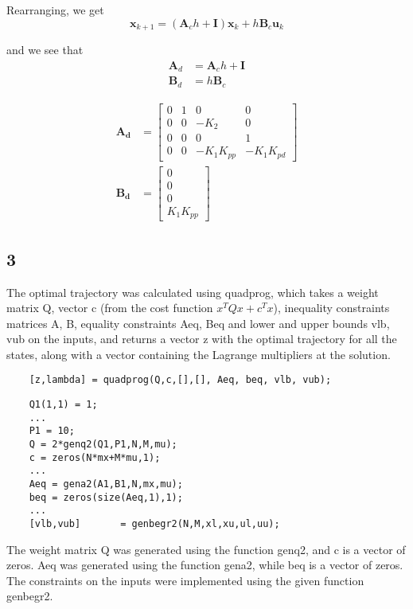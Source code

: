 Rearranging, we get
\begin{equation}
    \mathbf{x}_{k+1} = (\mathbf{A}_ch + \mathbf{I})\mathbf{x}_k + h\mathbf{B}_c\mathbf{u}_k
\end{equation}

and we see that
\begin{subequations}
    \begin{align}
        \mathbf{A}_d &= \mathbf{A}_ch+\mathbf{I} \\
        \mathbf{B}_d &= h\mathbf{B}_c
    \end{align}

\end{subequations}

\begin{subequations}
    \begin{align}
        \mathbf{A_d} &= \begin{bmatrix}
        0 & 1 & 0 & 0\\
        0 & 0 & -K_2 & 0\\
        0 & 0 & 0 & 1\\
        0 & 0 & -K_1K_{pp} & -K_1K_{pd}
        \end{bmatrix}\\
        \mathbf{B_d} &= \begin{bmatrix}
        0\\
        0\\
        0\\
        K_1K_{pp}
    \end{bmatrix}
    \end{align}
\end{subequations}

\subsection{3}
The optimal trajectory was calculated using quadprog, which takes a weight matrix Q, vector c (from the cost function $x^TQx + c^Tx$), inequality constraints matrices A, B, equality constraints Aeq, Beq and lower and upper bounds vlb, vub on the inputs, and returns a vector z with the optimal trajectory for all the states, along with a vector \lambda containing the Lagrange multipliers at the solution.

\begin{lstlisting}
    [z,lambda] = quadprog(Q,c,[],[], Aeq, beq, vlb, vub);
\end{lstlisting}

\begin{lstlisting}
    Q1(1,1) = 1;
    ...
    P1 = 10;  
    Q = 2*genq2(Q1,P1,N,M,mu);
    c = zeros(N*mx+M*mu,1); 
    ...
    Aeq = gena2(A1,B1,N,mx,mu);         
    beq = zeros(size(Aeq,1),1);
    ...
    [vlb,vub]       = genbegr2(N,M,xl,xu,ul,uu); 
\end{lstlisting}
The weight matrix Q was generated using the function genq2, and c is a vector of zeros. Aeq was generated using the function gena2, while beq is a vector of zeros. The constraints on the inputs were implemented using the given function genbegr2. 

